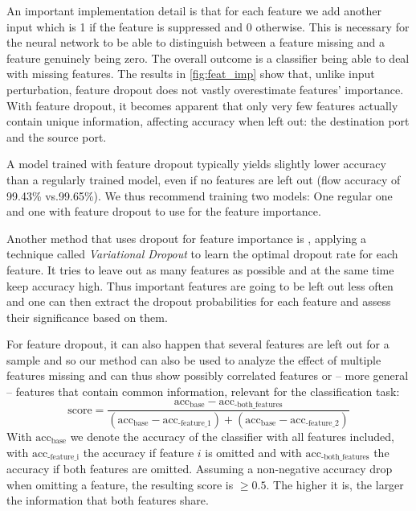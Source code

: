 \documentclass[conference]{IEEEtran}
\begin{document}
An important implementation detail is that for each feature we add another input which is 1 if the feature is suppressed and 0 otherwise. This is necessary for the neural network to be able to distinguish between a feature missing and a feature genuinely being zero. The overall outcome is a classifier being able to deal with missing features.
The results in \autoref{fig:feat_imp} show that, unlike input perturbation, feature dropout  does not vastly overestimate features' importance. With feature dropout, it becomes apparent that only very few features  actually contain unique information, affecting accuracy when left out: the destination port and the source port.

A model trained with feature dropout typically yields slightly lower accuracy than a regularly trained model, even if no features are left out (flow accuracy of 99.43\% vs.99.65\%). We thus recommend training two models: One regular one and one with feature dropout to use for the feature importance.

Another method that uses dropout for feature importance is \cite{chang_dropout_2017}, applying a technique called \textit{Variational Dropout} to learn the optimal dropout rate for each feature. It tries to leave out as many features as possible and at the same time keep accuracy high. Thus important features are going to be left out less often and one can then extract the dropout probabilities for each feature and assess their significance based on them.

For feature dropout, it can also happen that several features are left out for a sample and so our method can also be used to analyze the effect of multiple features missing and can thus show possibly correlated features or -- more general -- features that contain common information, relevant for the classification task:
\begin{equation}
\text{score} = \frac{\text{acc}_{\text{base}}-\text{acc}_{\text{-both\_features}}}{\left(\text{acc}_{\text{base}}-\text{acc}_{\text{-feature\_1}}\right) + \left(\text{acc}_{\text{base}}-\text{acc}_{\text{-feature\_2}}\right)}
\end{equation}
With $\text{acc}_{\text{base}}$ we denote the accuracy of the classifier with all features included, with $\text{acc}_{\text{-feature\_i}}$ the accuracy if feature $i$ is omitted and with $\text{acc}_{\text{-both\_features}}$ the accuracy if both features are omitted. Assuming a non-negative accuracy drop when omitting a feature, the resulting score is $\ge 0.5$. The higher it is, the larger the information that both features share.
\end{document}
